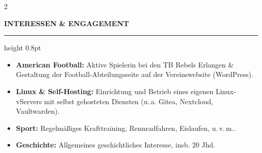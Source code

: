 \documentclass[10pt,a4paper]{article}
\newcommand{\mainheading}[1]{%
  \vspace{12pt}%
  {\large\bfseries\color{accent}\MakeUppercase{#1}}\par
  \vspace{2pt}%
  {\color{accent}\hrule height 0.8pt}%
  \vspace{8pt}%
}
\begin{document}
\begin{paracol}{2}
\begin{rightcolumn}
\mainheading{Interessen \& Engagement}

\begin{itemize}
  \item \textbf{American Football:} Aktive Spielerin bei den TB Rebels Erlangen \& Gestaltung der Football-Abteilungsseite auf der Vereinswebsite (WordPress).
  \item \textbf{Linux \& Self-Hosting:} Einrichtung und Betrieb eines eigenen Linux-vServers mit selbst gehosteten Diensten (u.\,a. Gitea, Nextcloud, Vaultwarden).
  \item \textbf{Sport:} Regelmäßiges Krafttraining, Rennradfahren, Eislaufen, u.\,v.\,m..
  \item \textbf{Geschichte:} Allgemeines geschichtliches Interesse, insb. 20 Jhd.
\end{itemize}

\end{rightcolumn}

\end{paracol}
\end{document}
